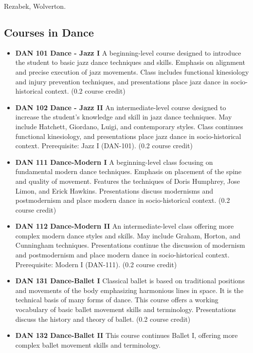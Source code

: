 \documentclass[
  letterpaper,
]{scrbook}
\providecommand{\tightlist}{%
  \setlength{\itemsep}{0pt}\setlength{\parskip}{0pt}}
\begin{document}
Rezabek, Wolverton.

\subsection{Courses in Dance}\label{courses-in-dance}

\begin{itemize}
\tightlist
\item
  \textbf{DAN 101 Dance - Jazz I} A beginning-level course designed to
  introduce the student to basic jazz dance techniques and skills.
  Emphasis on alignment and precise execution of jazz movements. Class
  includes functional kinesiology and injury prevention techniques, and
  presentations place jazz dance in socio-historical context. (0.2
  course credit)
\item
  \textbf{DAN 102 Dance - Jazz II} An intermediate-level course designed
  to increase the student's knowledge and skill in jazz dance
  techniques. May include Hatchett, Giordano, Luigi, and contemporary
  styles. Class continues functional kinesiology, and presentations
  place jazz dance in socio-historical context. Prerequisite: Jazz I
  (DAN-101). (0.2 course credit)
\item
  \textbf{DAN 111 Dance-Modern I} A beginning-level class focusing on
  fundamental modern dance techniques. Emphasis on placement of the
  spine and quality of movement. Features the techniques of Doris
  Humphrey, Jose Limon, and Erick Hawkins. Presentations discuss
  modernisms and postmodernism and place modern dance in
  socio-historical context. (0.2 course credit)
\item
  \textbf{DAN 112 Dance-Modern II} An intermediate-level class offering
  more complex modern dance styles and skills. May include Graham,
  Horton, and Cunningham techniques. Presentations continue the
  discussion of modernism and postmodernism and place modern dance in
  socio-historical context. Prerequisite: Modern I (DAN-111). (0.2
  course credit)
\item
  \textbf{DAN 131 Dance-Ballet I} Classical ballet is based on
  traditional positions and movements of the body emphasizing harmonious
  lines in space. It is the technical basis of many forms of dance. This
  course offers a working vocabulary of basic ballet movement skills and
  terminology. Presentations discuss the history and theory of ballet.
  (0.2 course credit)
\item
  \textbf{DAN 132 Dance-Ballet II} This course continues Ballet I,
  offering more complex ballet movement skills and terminology.

\end{itemize}
\end{document}
